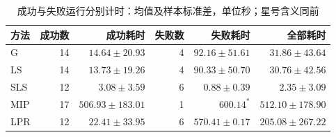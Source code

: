 \begin{table}[htbp]
\centering\small
\caption{成功与失败运行分别计时：均值及样本标准差，单位秒；星号含义同前}\label{tab:timing-split}
\begin{tabular}{lrrrrr}\toprule
方法 & 成功数 & 成功耗时 & 失败数 & 失败耗时 & 全部耗时 \\\midrule
G & 14 & $14.64\pm20.93$ & 4 & $92.16\pm51.61$ & $31.86\pm43.64$ \\
LS & 14 & $13.73\pm19.26$ & 4 & $90.33\pm50.70$ & $30.76\pm42.56$ \\
SLS & 12 & $3.08\pm3.59$ & 6 & $0.88\pm0.39$ & $2.35\pm3.09$ \\
MIP & 17 & $506.93\pm183.01$ & 1 & $600.14^{*}$ & $512.10\pm178.90$ \\
LPR & 12 & $22.41\pm33.95$ & 6 & $570.41\pm0.17$ & $205.08\pm267.22$ \\
\bottomrule\end{tabular}
\end{table}
